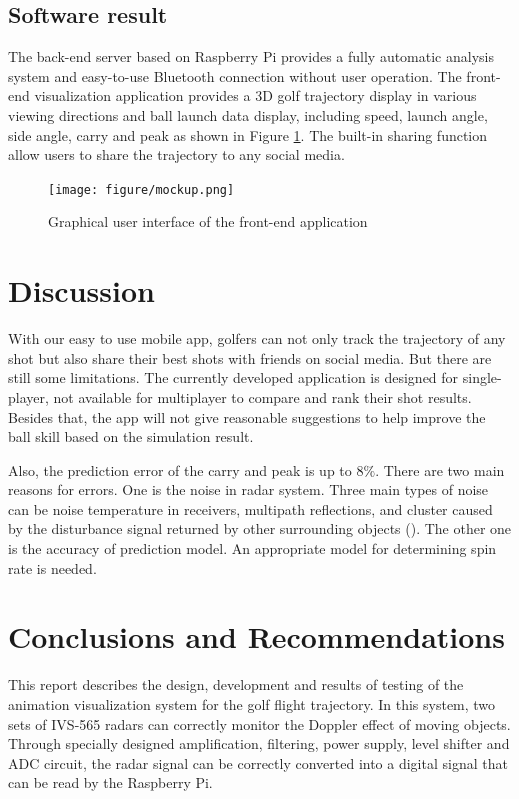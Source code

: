 \subsection{Software result}
The back-end server based on Raspberry Pi provides a fully automatic analysis system and easy-to-use Bluetooth connection without user operation. The front-end visualization application provides a 3D golf trajectory display in various viewing directions and ball launch data display, including speed, launch angle, side angle, carry and peak as shown in Figure \ref{fig:mockup}. The built-in sharing function allow users to share the trajectory to any social media. 
\begin{figure}[H]
    \centering
    \texttt{[image: figure/mockup.png]}
    \caption{Graphical user interface of the front-end application}
     \label{fig:mockup}
\end{figure}

\section{Discussion}
With our easy to use mobile app, golfers can not only track the trajectory of any shot but also share their best shots with friends on social media. But there are still some limitations. The currently developed application is designed for single-player, not available for multiplayer to compare and rank their shot results. Besides that, the app will not give reasonable suggestions to help improve the ball skill based on the simulation result. 

Also, the prediction error of the carry and peak is up to 8$\%$. There are two main reasons for errors. One is the noise in radar system. Three main types of noise can be noise temperature in receivers, multipath reflections, and cluster caused by the disturbance signal returned by other surrounding objects (\cite{martin2012evaluation}). The other one is the accuracy of prediction model. An appropriate model for determining spin rate is needed.


\section{Conclusions and Recommendations}
This report describes the design, development and results of testing of the animation visualization system for the golf flight trajectory. 
In this system, two sets of IVS-565 radars can correctly monitor the Doppler effect of moving objects. Through specially designed amplification, filtering, power supply, level shifter and ADC circuit, the radar signal can be correctly converted into a digital signal that can be read by the Raspberry Pi.

